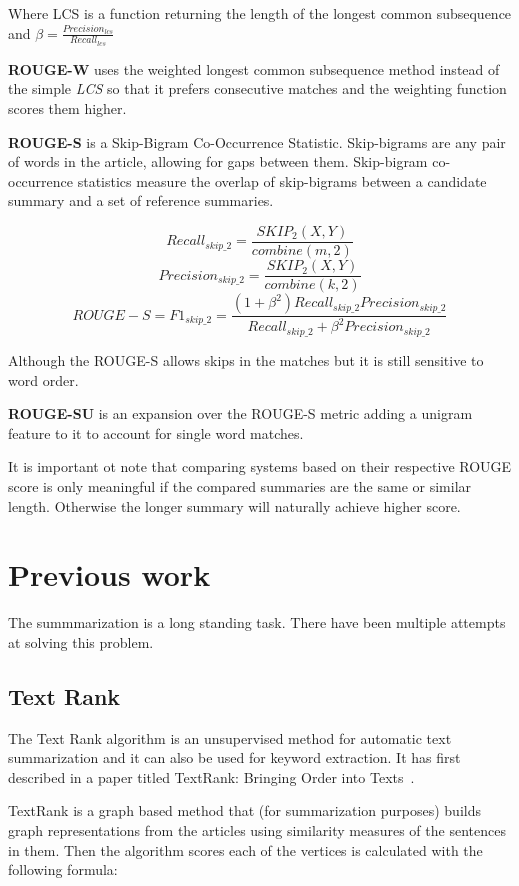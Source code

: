 Where LCS is a function returning the length of the longest common subsequence and \(\beta = \frac{Precision_{lcs}}{Recall_{lcs}}\)

\textbf{ROUGE-W} uses the weighted longest common subsequence method instead of the simple \textit{LCS} so that it prefers consecutive matches and the weighting function scores them higher.

\textbf{ROUGE-S} is a Skip-Bigram Co-Occurrence Statistic. Skip-bigrams are any pair of words in the article, allowing for gaps between them. Skip-bigram co-occurrence statistics measure the overlap of skip-bigrams between a candidate summary and a set of reference summaries.

\[Recall_{skip\_2} = \frac{SKIP_2(X, Y)}{combine(m, 2)}\]
\[Precision_{skip\_2} = \frac{SKIP_2(X, Y)}{combine(k, 2)}\]
\[ROUGE-S = F1_{skip\_2} = \frac{(1 + \beta^2)Recall_{skip\_2}Precision_{skip\_2}}{Recall_{skip\_2} + \beta^2Precision_{skip\_2}}\]

Although the ROUGE-S allows skips in the matches but it is still sensitive to word order.

\textbf{ROUGE-SU} is an expansion over the ROUGE-S metric adding a unigram feature to it to account for single word matches.

It is important ot note that comparing systems based on their respective ROUGE score is only meaningful if the compared summaries are the same or similar length. Otherwise the longer summary will naturally achieve higher score.

\section{Previous work}
The summmarization is a long standing task. There have been multiple attempts at solving this problem.

\subsection{Text Rank}

The Text Rank algorithm is an unsupervised method for automatic text summarization and it can also be used for keyword extraction. It has first described in a paper titled TextRank: Bringing Order into Texts~\cite{TextRank:2004}.

TextRank is a graph based method that (for summarization purposes) builds graph representations from the articles using similarity measures of the sentences in them. Then the algorithm scores each of the vertices is calculated with the following formula:


